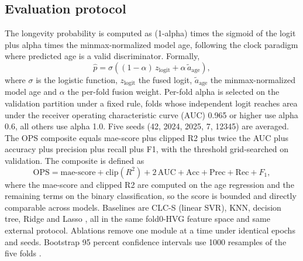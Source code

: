 \documentclass[unnumsec,webpdf,contemporary,large]{oup-authoring-template}
\begin{document}
\subsection{Evaluation protocol}\label{sec:eval}
The longevity probability is computed as (1-alpha) times the sigmoid of the logit plus alpha times the minmax-normalized model age, following the clock paradigm where predicted age is a valid discriminator. Formally,
\begin{equation}
\hat{p} = \sigma\!\left((1-\alpha)\, z_{\mathrm{logit}} + \alpha\, \tilde{a}_{\mathrm{age}}\right),
\label{eq:prob}
\end{equation}
 where $\sigma$ is the logistic function, $z_{\mathrm{logit}}$ the fused logit, $\tilde{a}_{\mathrm{age}}$ the minmax-normalized model age and $\alpha$ the per-fold fusion weight. Per-fold alpha is selected on the validation partition under a fixed rule, folds whose independent logit reaches area under the receiver operating characteristic curve (AUC) 0.965 or higher use alpha 0.6, all others use alpha 1.0. Five seeds (42, 2024, 2025, 7, 12345) are averaged. The OPS composite equals mae-score plus clipped R2 plus twice the AUC plus accuracy plus precision plus recall plus F1, with the threshold grid-searched on validation. The composite is defined as
\begin{equation}
\mathrm{OPS} = \mathrm{mae\text{-}score} + \mathrm{clip}(R^2) + 2\,\mathrm{AUC} + \mathrm{Acc} + \mathrm{Prec} + \mathrm{Rec} + F_1,
\label{eq:ops}
\end{equation}
 where the mae-score and clipped R2 are computed on the age regression and the remaining terms on the binary classification, so the score is bounded and directly comparable across models. Baselines are CLC-S (linear SVR), KNN, decision tree, Ridge and Lasso \cite{tibshirani1996regression,breiman2001random,cover1967nearest,pedregosa2011scikit,paszke2019pytorch}, all in the same fold0-HVG feature space and same external protocol. Ablations remove one module at a time under identical epochs and seeds. Bootstrap 95 percent confidence intervals use 1000 resamples of the five folds \cite{efron1993introduction,delong1988comparing,benjamini1995controlling,mann1947test,liu2024statistical,chen2024evaluation,zhu2024benchmark,robin_2011,tsoucas_2019}.
\end{document}
